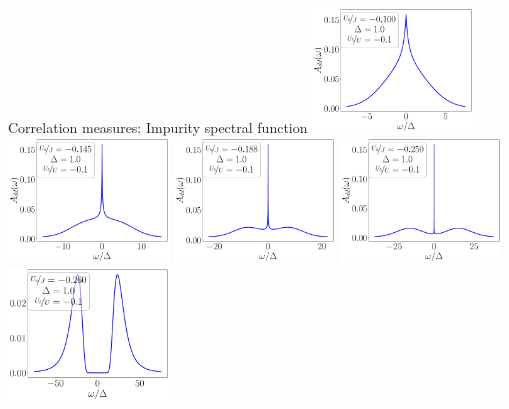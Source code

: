 \documentclass[aspectratio=169]{beamer}
\begin{document}
\begin{frame}[noframenumbering]{Correlation measures: Impurity spectral function}
\centering
\includegraphics[width=0.32\textwidth]{./figures/spec_func_Ub_by_J=-0.100.pdf}
\includegraphics[width=0.32\textwidth]{./figures/spec_func_Ub_by_J=-0.145.pdf}
\includegraphics[width=0.32\textwidth]{./figures/spec_func_Ub_by_J=-0.188.pdf}
\includegraphics[width=0.32\textwidth]{./figures/spec_func_Ub_by_J=-0.250.pdf}
\includegraphics[width=0.32\textwidth]{./figures/spec_func_Ub_by_J=-0.26.pdf}
\end{frame}
\end{document}
